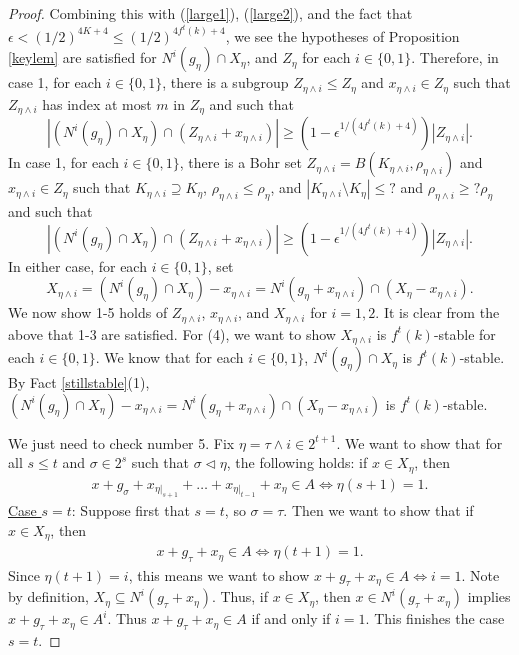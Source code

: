 \documentclass[11pt]{article}
\theoremstyle{definition}
\begin{document}
\begin{proof}
Combining this with (\ref{large1}), (\ref{large2}), and the fact that $\epsilon<(1/2)^{4K+4}\leq (1/2)^{4f^t(k)+4}$, we see the hypotheses of Proposition \ref{keylem} are satisfied for $N^i(g_{\eta})\cap X_{\eta}$, and $Z_{\eta}$ for each $i\in \{0,1\}$.  Therefore, in case 1, for each $i\in \{0,1\}$, there is a subgroup $Z_{\eta \wedge i}\leq Z_{\eta}$ and $x_{\eta \wedge i}\in Z_{\eta}$ such that $Z_{\eta\wedge i}$ has index at most $m$ in $Z_{\eta}$ and such that 
$$
|(N^i(g_{\eta})\cap X_{\eta}) \cap (Z_{\eta \wedge i}+x_{\eta \wedge i})|\geq (1-\epsilon^{1/(4f^t(k)+4)})|Z_{\eta \wedge i}|.
$$
In case 1, for each $i\in \{0,1\}$, there is a Bohr set $Z_{\eta \wedge i}=B(K_{\eta \wedge i},\rho_{\eta \wedge i})$ and $x_{\eta \wedge i}\in Z_{\eta}$ such that $K_{\eta\wedge i}\supseteq K_{\eta}$, $\rho_{\eta\wedge i}\leq \rho_{\eta}$, and $|K_{\eta\wedge i}\setminus K_{\eta}|\leq ?$ and $\rho_{\eta\wedge i}\geq ?\rho_{\eta}$ and such that 
$$
|(N^i(g_{\eta})\cap X_{\eta}) \cap (Z_{\eta \wedge i}+x_{\eta \wedge i})|\geq (1-\epsilon^{1/(4f^t(k)+4)})|Z_{\eta \wedge i}|.
$$
In either case, for each $i\in \{0,1\}$, set 
$$
X_{\eta \wedge i}=(N^i(g_{\eta})\cap X_{\eta})-x_{\eta\wedge i}=N^i(g_{\eta}+x_{\eta \wedge i})\cap( X_{\eta}-x_{\eta \wedge i} ).
$$
 We now show 1-5 holds of $Z_{\eta\wedge i}$, $x_{\eta\wedge i}$, and $X_{\eta\wedge i}$ for $i=1,2$.  It is clear from the above that 1-3 are satisfied.  For (4), we want to show $X_{\eta\wedge i}$ is $f^t(k)$-stable for each $i\in \{0,1\}$.  We know that for each $i\in \{0,1\}$, $N^i(g_{\eta})\cap X_{\eta}$ is $f^t(k)$-stable. By Fact \ref{stillstable}(1), $(N^i(g_{\eta})\cap X_{\eta})-x_{\eta\wedge i}=N^i(g_{\eta}+x_{\eta \wedge i})\cap (X_{\eta}-x_{\eta\wedge i})$ is $f^t(k)$-stable.  

We just need to check number 5.  Fix $\eta=\tau\wedge i\in 2^{t+1}$.  We want to show that for all $s\leq t$ and $\sigma \in 2^s$ such that $\sigma \triangleleft \eta$, the following holds: if $x\in X_{\eta}$, then
\begin{align}\label{6}
x+g_{\sigma}+ x_{\eta|_{s+1}}+\ldots+x_{\eta|_{t-1}}+x_{\eta} \in A \Leftrightarrow \eta(s+1)=1.
\end{align}
\underline{Case $s=t$}: Suppose first that $s=t$, so $\sigma = \tau$.  Then we want to show that if $x\in X_{\eta}$, then 
\begin{align}\label{7}
x+g_{\tau}+x_{\eta} \in A \Leftrightarrow \eta(t+1)=1.
\end{align}
Since $\eta(t+1)=i$, this means we want to show $x+g_{\tau}+x_{\eta} \in A \Leftrightarrow i=1$.  Note by definition, $X_{\eta}\subseteq N^i(g_{\tau}+x_{\eta})$.  Thus, if $x\in X_{\eta}$, then $x\in N^i(g_{\tau}+x_{\eta})$ implies $x+g_{\tau}+x_{\eta}\in A^i$.  Thus $x+g_{\tau}+x_{\eta}\in A$ if and only if $i=1$.  This finishes the case $s=t$.


\end{proof}
\end{document}
